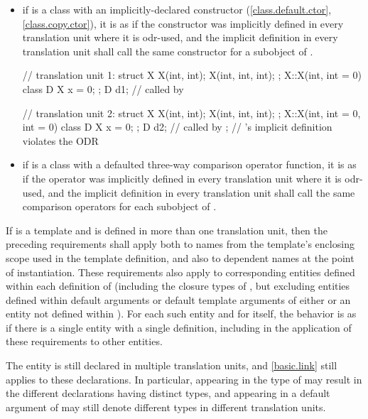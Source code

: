 \begin{itemize}
\item if  is a class with an implicitly-declared
constructor (\ref{class.default.ctor}, \ref{class.copy.ctor}),
it is as if the constructor was
implicitly defined in every translation unit where it is odr-used, and the
implicit definition in every translation unit shall call the same
constructor for a subobject of .
\begin{example}

\begin{codeblock}
// translation unit 1:
struct X {
  X(int, int);
  X(int, int, int);
};
X::X(int, int = 0) { }
class D {
  X x = 0;
};
D d1;                           //  called by 

// translation unit 2:
struct X {
  X(int, int);
  X(int, int, int);
};
X::X(int, int = 0, int = 0) { }
class D {
  X x = 0;
};
D d2;                           //  called by ;
                                // 's implicit definition violates the ODR
\end{codeblock}
\end{example}

\item if  is a class with
a defaulted three-way comparison operator function,
it is as if the operator was
implicitly defined in every translation unit where it is odr-used, and the
implicit definition in every translation unit shall call the same
comparison operators for each subobject of .
\end{itemize}
If  is a template and is defined in more than one
translation unit, then the preceding requirements
shall apply both to names from the template's enclosing scope used in the
template definition, and also to dependent names at
the point of instantiation.
These requirements also apply to corresponding entities
defined within each definition of 
(including the closure types of ,
but excluding entities defined within default arguments or
default template arguments of either  or
an entity not defined within ).
For each such entity and for  itself,
the behavior is as if there is a single entity with a single definition,
including in the application of these requirements to other entities.
\begin{note}
The entity is still declared in multiple translation units, and \ref{basic.link}
still applies to these declarations. In particular,
appearing in the type of  may result
in the different declarations having distinct types, and
 appearing in a default argument of 
may still denote different types in different translation units.
\end{note}
